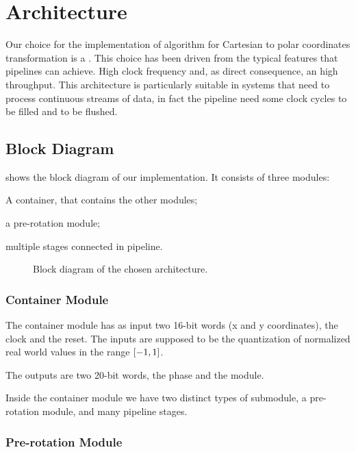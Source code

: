 \section{Architecture}\label{sec:arch}

Our choice for the implementation of \cordic{} algorithm for Cartesian to polar
coordinates transformation is a . This choice
has been driven from the typical features that pipelines can achieve. High clock
frequency and, as direct consequence, an high throughput. This architecture is
particularly suitable in systems that need to process continuous streams of
data, in fact the pipeline need some clock cycles to be filled and to be
flushed.

\subsection{Block Diagram}

 shows the block diagram of our implementation. It
consists of three modules:
\begin{enumerate*}[label=]
	\item A container, that contains the other modules;
	\item a pre-rotation module;
	\item multiple stages connected in pipeline.
\end{enumerate*}

\begin{figure}[p]
	\caption{Block diagram of the chosen architecture.}\label{fig:blockdiagram}
\end{figure}

\subsubsection{Container Module}

The container module has as input two 16-bit words (x and y coordinates), the
clock and the reset. The inputs are supposed to be the quantization of
normalized real world values in the range \(\interval{-1}{1}\).

The outputs are two 20-bit words, the phase and the module.

Inside the container module we have two distinct types of submodule, a
pre-rotation module, and many pipeline stages.

\subsubsection{Pre-rotation Module}

